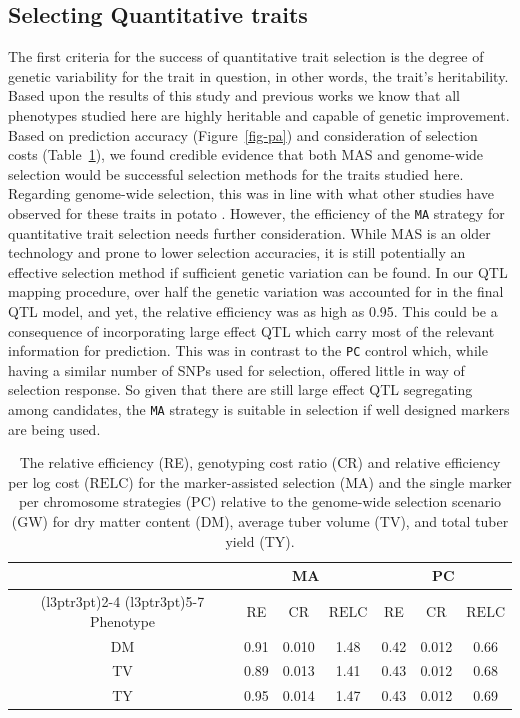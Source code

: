 \begin{refsection}
\subsection{Selecting Quantitative
traits}\label{selecting-quantitative-traits}

The first criteria for the success of quantitative trait selection is the
degree of genetic variability for the trait in question, in other words, 
the trait's heritability. Based upon the results of this study and previous
works \parencite{Adams2022} we know that all phenotypes studied here are highly
heritable and capable of genetic improvement. Based on prediction 
accuracy (Figure~\ref{fig-pa}) and consideration of
selection costs (Table~\ref{tbl-re}), we found credible evidence that
both MAS and genome-wide selection would be successful selection methods
for the traits studied here. Regarding genome-wide selection, this was in line with what other studies have observed for
these traits in potato \parencite{Adams2023,Wilson2021}. However, the
efficiency of the \texttt{MA} strategy for quantitative trait selection
needs further consideration. While MAS is an older technology and prone to lower selection accuracies, it is still potentially an effective selection method
if sufficient genetic variation can be found. In our QTL mapping
procedure, over half the genetic variation was accounted for in the
final QTL model, and yet, the relative efficiency was as high as 0.95.
This could be a consequence of incorporating large effect QTL which
carry most of the relevant information for prediction. This was in
contrast to the \texttt{PC} control which, while having a similar number
of SNPs used for selection, offered little in way of selection
response. So given that there are still large effect QTL segregating
among candidates, the \texttt{MA} strategy is suitable in selection if
well designed markers are being used.

\begin{table}
\caption{\label{tbl-re}The relative efficiency (RE), genotyping cost ratio (CR) and relative efficiency per log cost
(\(\mathrm{RELC}\)) for the marker-assisted selection (MA) and the
single marker per chromosome strategies (PC) relative to the genome-wide
selection scenario (GW) for dry matter content (DM), average tuber
volume (TV), and total tuber yield (TY). }\tabularnewline

\centering
\begin{tabular}{ccccccc}
\toprule
\multicolumn{1}{c}{ } & \multicolumn{3}{c}{MA} & \multicolumn{3}{c}{PC} \\
\cmidrule(l{3pt}r{3pt}){2-4} \cmidrule(l{3pt}r{3pt}){5-7}
Phenotype & RE & CR & $\mathrm{RELC}$ & RE & CR & $\mathrm{RELC}$\\
\midrule
DM & 0.91 & 0.010 & 1.48 & 0.42 & 0.012 & 0.66\\
TV & 0.89 & 0.013 & 1.41 & 0.43 & 0.012 & 0.68\\
TY & 0.95 & 0.014 & 1.47 & 0.43 & 0.012 & 0.69\\
\bottomrule
\end{tabular}
\end{table}


\end{refsection}
